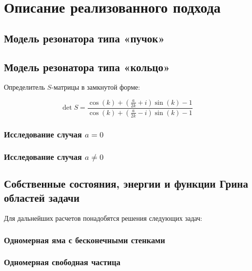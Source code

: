 \chapter{Описание реализованного подхода}
\label{chapter2}

\section{Модель резонатора типа «пучок»} %




\section{Модель резонатора типа «кольцо»}



Определитель $S$-матрицы в замкнутой форме:

\[
\det S = 
\frac
{\cos\left(k\right) + {\left(\frac{a}{2 k} + i\right)} \sin\left(k\right) - 1}
{\cos\left(k\right) + {\left(\frac{a}{2 k} - i\right)} \sin\left(k\right) - 1}
\]

\subsection{Исследование случая $a = 0$}
\todo{!!!}

\subsection{Исследование случая $a \ne 0$}
\todo{!!!}



\section{Собственные состояния, энергии и функции Грина областей задачи}
Для дальнейших расчетов понадобятся решения следующих задач:

\subsection{Одномерная яма с бесконечными стенками}


\subsection{Одномерная свободная частица}


